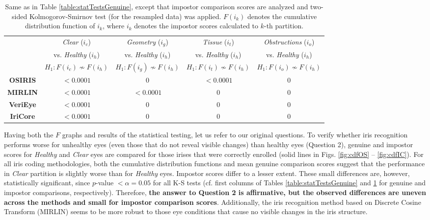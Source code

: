 \documentclass[article,12pt]{elsarticle}
\newcommand{\textapprox}{\raisebox{0.5ex}{\texttildelow}}
\begin{document}
\begin{table}[!htb]
\renewcommand{\arraystretch}{1.1}
\caption{Same as in Table \ref{table:statTestsGenuine}, except that impostor comparison scores are analyzed and two-sided Kolmogorov-Smirnov test (for the resampled data) was applied. $F(i_k)$ denotes the cumulative distribution function of $i_k$, where $i_k$ denotes the impostor scores calculated to $k$-th partition.}
\label{table:statTestsImpostor}
\centering\scriptsize
\begin{tabular}[t]{c|c|c|c|c|}
\cline{2-5}
& \emph{Clear} ($i_c$) & \emph{Geometry} ($i_g$) & \emph{Tissue} ($i_t$) & \emph{Obstructions} ($i_o$) \\
& vs. \emph{Healthy} ($i_h$) & vs. \emph{Healthy} ($i_h$) & vs. \emph{Healthy} ($i_h$) & vs. \emph{Healthy} ($i_h$) \\
& $H_1: F(i_c) \nsim F(i_h)$ & $H_1: F(i_g) \nsim F(i_h)$ & $H_1: F(i_t) \nsim F(i_h)$ &  $H_1: F(i_o) \nsim F(i_h)$\\\hline\hline
\multicolumn{1}{|c|}{\bf OSIRIS} & $< 0.0001$ & \textapprox 0 & $< 0.0001$ & \textapprox 0 \\\hline
\multicolumn{1}{|c|}{\bf MIRLIN} &  $< 0.0001$ & $< 0.0001$ & \textapprox 0 & \textapprox 0 \\\hline
\multicolumn{1}{|c|}{\bf VeriEye} & $< 0.0001$ & \textapprox 0 & \textapprox 0 & \textapprox 0 \\\hline
\multicolumn{1}{|c|}{\bf IriCore} & $< 0.0001$ & \textapprox 0 & \textapprox 0  & \textapprox 0 \\\hline
\end{tabular}
\end{table}

Having both the $F$ graphs and results of the statistical testing, let us refer to our original questions. To verify whether iris recognition performs worse for unhealthy eyes (even those that do not reveal visible changes) than healthy eyes (Question 2), genuine and impostor scores for \emph{Healthy} and \emph{Clear} eyes are compared for those irises that were correctly enrolled (solid lines in Figs. \ref{fig:cdfOS} -- \ref{fig:cdfIC}). For all iris coding methodologies, both the cumulative distribution functions and mean genuine comparison scores suggest that the performance in \emph{Clear} partition is slightly worse than for \emph{Healthy} eyes. Impostor scores differ to a lesser extent. These small differences are, however, statistically significant, since $p$-value $<\alpha=0.05$ for all K-S tests (cf. first columns of Tables \ref{table:statTestsGenuine} and \ref{table:statTestsImpostor} for genuine and impostor comparisons, respectively). Therefore, \textbf{the answer to Question 2 is affirmative, but the observed differences are uneven across the methods and small for impostor comparison scores}. Additionally, the iris recognition method based on Discrete Cosine Transform (MIRLIN) seems to be more robust to those eye conditions that cause no visible changes in the iris structure.
\end{document}
